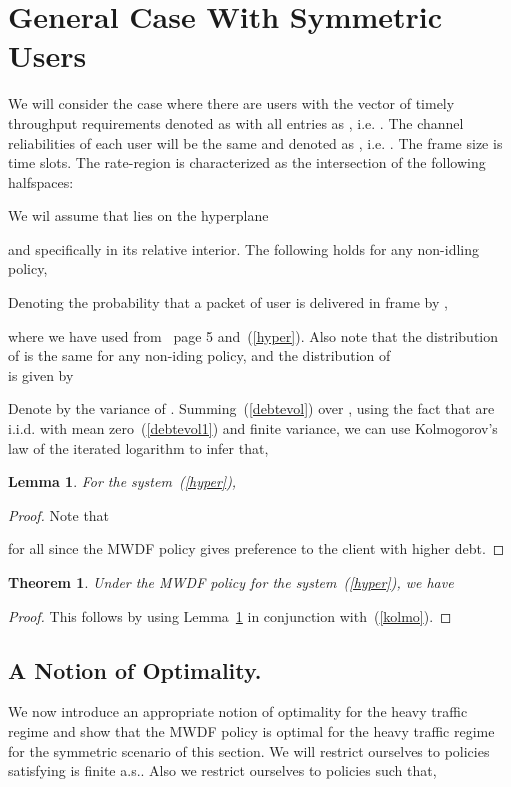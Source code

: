 \documentclass[letterpaper, 10 pt, conference]{ieeeconf}
\newtheorem{lemma}{Lemma}
\newtheorem{theorem}{Theorem}
\begin{document}
\section{General Case With Symmetric Users}\label{sec6}
We will consider the case where there are  users with the vector of timely throughput requirements denoted as  with all entries as , i.e. . The channel reliabilities of each user will be the same and denoted as , i.e. . The frame size is  time slots. The rate-region is characterized as the intersection of the following  halfspaces:

We wil assume that  lies on the hyperplane 

and specifically in its relative interior.
The following holds for any non-idling policy,

Denoting the probability that a packet of user  is delivered in frame  by ,

where we have used   from~\cite{c3} page 5 and~(\ref{hyper}). Also note that the distribution of  is the same for any non-iding policy, and the distribution of \\

is given by

Denote by  the variance of . Summing~(\ref{debtevol}) over , using the fact that  are i.i.d. with mean zero~(\ref{debtevol1}) and finite variance, we can use Kolmogorov's law of the iterated logarithm to infer that,

\begin{lemma}\label{ssc}
For the system~(\ref{hyper}), 
 
\end{lemma}
\begin{proof}
Note that 

for all  since the MWDF policy gives preference to the client with higher debt.
\end{proof}
\begin{theorem}\label{theoremnotopt}
Under the MWDF policy for the system~(\ref{hyper}), we have

\end{theorem}
\begin{proof}
This follows by using Lemma~\ref{ssc} in conjunction with~(\ref{kolmo}).  
\end{proof}
\subsection{A Notion of Optimality.}
We now introduce an appropriate notion of optimality for the heavy traffic regime and show that the MWDF policy is optimal for the heavy traffic regime for the symmetric scenario of this section. We will restrict ourselves to policies satisfying  is finite a.s.. Also we restrict ourselves to policies such that, 
\end{document}
